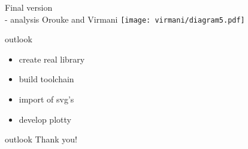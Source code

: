 \documentclass[ucs,9ptb]{beamer}
\begin{document}
\begin{frame}{Final version\\- analysis}
  Orouke and Virmani
  \texttt{[image: virmani/diagram5.pdf]}
\end{frame}

\begin{frame}{outlook}
  \begin{itemize}
    \item create real library
    \item build toolchain
    \item import of svg's
    \item develop plotty
  \end{itemize}
\end{frame}

\begin{frame}{outlook}
  \hspace{40mm}\huge{Thank you!}
\end{frame}
\end{document}
